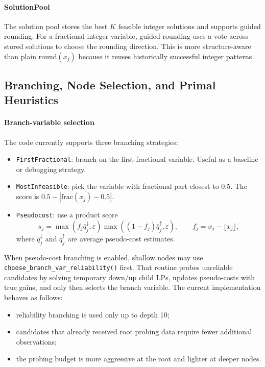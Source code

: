 \paragraph{SolutionPool}
The solution pool stores the best \(K\) feasible integer solutions and supports guided rounding. For a fractional integer variable, guided rounding uses a vote across stored solutions to choose the rounding direction. This is more structure-aware than plain \(\text{round}(x_j)\) because it reuses historically successful integer patterns.

\subsection{Branching, Node Selection, and Primal Heuristics}

\paragraph{Branch-variable selection}
The code currently supports three branching strategies:
\begin{itemize}
  \item \texttt{FirstFractional}: branch on the first fractional variable. Useful as a baseline or debugging strategy.
  \item \texttt{MostInfeasible}: pick the variable with fractional part closest to 0.5. The score is
        \(0.5 - |\text{frac}(x_j)-0.5|\).
  \item \texttt{Pseudocost}: use a product score
        \begin{equation}
          s_j = \max\!\left(f_j \bar q_j^{\downarrow}, \varepsilon\right)
                \max\!\left((1-f_j) \bar q_j^{\uparrow}, \varepsilon\right),
          \qquad f_j = x_j - \lfloor x_j \rfloor,
        \end{equation}
        where \(\bar q_j^{\downarrow}\) and \(\bar q_j^{\uparrow}\) are average pseudo-cost estimates.
\end{itemize}

When pseudo-cost branching is enabled, shallow nodes may use
\texttt{choose\_branch\_var\_reliability()} first. That routine probes unreliable candidates by solving temporary down/up child LPs, updates pseudo-costs with true gains, and only then selects the branch variable. The current implementation behaves as follows:
\begin{itemize}
  \item reliability branching is used only up to depth 10;
  \item candidates that already received root probing data require fewer additional observations;
  \item the probing budget is more aggressive at the root and lighter at deeper nodes.
\end{itemize}

